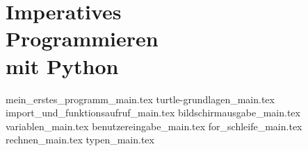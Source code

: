 
\part[Imperatives Programmieren mit Python]{Imperatives \\ Programmieren \\ mit Python}
\label{part-programmieren-mit-python}

{mein_erstes_programm_main.tex}
{turtle-grundlagen_main.tex}
{import_und_funktionsaufruf_main.tex}
{bildschirmausgabe_main.tex}
{variablen_main.tex}
{benutzereingabe_main.tex}
{for_schleife_main.tex}
{rechnen_main.tex}
{typen_main.tex}
